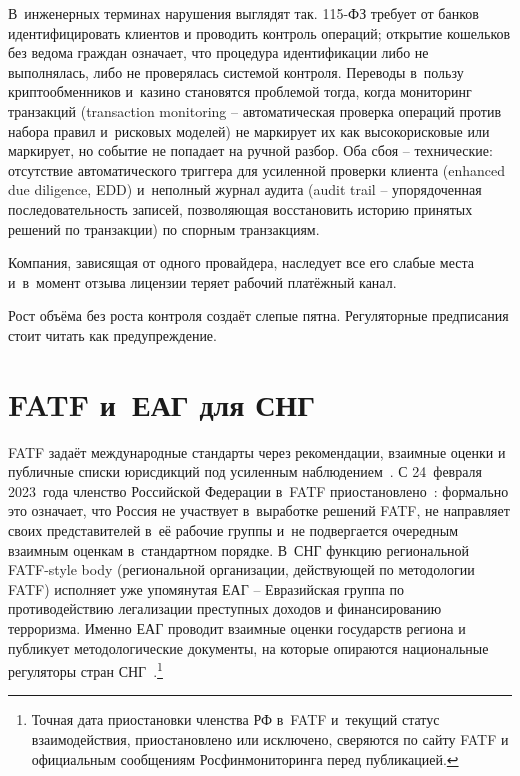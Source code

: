 В~инженерных терминах нарушения выглядят так.
115-ФЗ требует от банков идентифицировать клиентов и проводить
контроль операций; открытие кошельков без ведома граждан означает,
что процедура идентификации либо не выполнялась, либо не
проверялась системой контроля. Переводы в~пользу криптообменников
и~казино становятся проблемой тогда, когда мониторинг транзакций (transaction monitoring -- автоматическая проверка операций против набора правил и~рисковых моделей)
не маркирует их как высокорисковые или маркирует, но событие
не попадает на ручной разбор. Оба сбоя -- технические: отсутствие
автоматического триггера для усиленной проверки клиента (enhanced due diligence, EDD) и~неполный
журнал аудита (audit trail -- упорядоченная последовательность записей, позволяющая восстановить историю принятых решений по транзакции) по спорным транзакциям.

Компания, зависящая от одного провайдера, наследует все его
слабые места и~в~момент отзыва лицензии теряет рабочий платёжный
канал.

Рост объёма без роста контроля создаёт слепые пятна. Регуляторные
предписания стоит читать как предупреждение.

\section{FATF и~ЕАГ для СНГ}\label{sec:aml-fatf-eag}

FATF задаёт международные стандарты через рекомендации, взаимные
оценки и публичные списки юрисдикций под усиленным
наблюдением~\cite{fatf-recs,fatf-increased-monitoring}. С 24~февраля
2023~года членство Российской Федерации в~FATF
приостановлено~\cite{fatf-russia-suspension-2023}: формально это
означает, что Россия не участвует в~выработке решений FATF,
не направляет своих представителей в~её рабочие группы и~не
подвергается очередным взаимным оценкам в~стандартном порядке.
В~СНГ функцию региональной FATF-style body (региональной организации, действующей по методологии FATF) исполняет уже упомянутая ЕАГ -- Евразийская
группа по противодействию легализации преступных доходов
и финансированию терроризма. Именно ЕАГ
проводит взаимные оценки государств региона и публикует
методологические документы, на которые опираются национальные
регуляторы стран
СНГ~\cite{eag-overview,eag-mutual-evaluations}.\footnote{Точная
дата приостановки членства РФ в~FATF и~текущий статус
взаимодействия, приостановлено или исключено, сверяются по сайту
FATF и официальным сообщениям Росфинмониторинга перед публикацией.}

